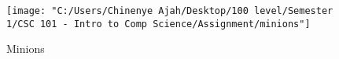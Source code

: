\documentclass{article}
\begin{document}
	\begin{figure}
		\texttt{[image: "C:/Users/Chinenye Ajah/Desktop/100 level/Semester 1/CSC 101 - Intro to Comp Science/Assignment/minions"]}
		\caption{Minions}
		\label{fig:minions}
	\end{figure}
	
\end{document}
